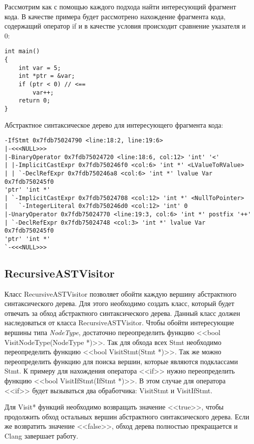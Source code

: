 Рассмотрим как с помощью каждого подхода найти интересующий фрагмент кода. В качестве примера
будет рассмотрено нахождение фрагмента кода, содержащий оператор if и в качестве условия 
происходит сравнение указателя и 0:
\begin{lstlisting}
int main()
{
	int var = 5;
	int *ptr = &var;
	if (ptr < 0) // <==
		var++;
	return 0;
}
\end{lstlisting}

Абстрактное синтаксическое дерево для интересующего фрагмента кода:
\begin{lstlisting}[basicstyle=\tiny]
-IfStmt 0x7fdb75024790 <line:18:2, line:19:6>
|-<<<NULL>>>
|-BinaryOperator 0x7fdb75024720 <line:18:6, col:12> 'int' '<'
| |-ImplicitCastExpr 0x7fdb750246f0 <col:6> 'int *' <LValueToRValue>
| | `-DeclRefExpr 0x7fdb750246a8 <col:6> 'int *' lvalue Var 0x7fdb750245f0 
'ptr' 'int *'
| `-ImplicitCastExpr 0x7fdb75024708 <col:12> 'int *' <NullToPointer>
|   `-IntegerLiteral 0x7fdb750246d0 <col:12> 'int' 0
|-UnaryOperator 0x7fdb75024770 <line:19:3, col:6> 'int *' postfix '++'
| `-DeclRefExpr 0x7fdb75024748 <col:3> 'int *' lvalue Var 0x7fdb750245f0 
'ptr' 'int *'
`-<<<NULL>>>
\end{lstlisting}

\subsection{RecursiveASTVisitor}
Класс RecursiveASTVisitor позволяет обойти каждую вершину абстрактного синтаксического дерева.
Для этого необходимо создать класс, который будет отвечать за обход абстрактного синтаксического 
дерева. Данный класс должен наследоваться от класса RecursiveASTVisitor. Чтобы обойти интересующие вершины
типа {\em NodeType},
достаточно переопределить функцию <<bool VisitNodeType(NodeType *)>>. Так для обхода всех Stmt 
необходимо переопределить функцию <<bool VisitStmt(Stmt *)>>. Так же можно переопределить функцию
для поиска вершин, которые являются подклассами Stmt. К примеру для нахождения оператора <<if>>
нужно переопределить функцию <<bool VisitIfStmt(IfStmt *)>>. В этом случае для оператора <<if>> 
будет вызываться два обработчика: VisitStmt и VisitIfStmt.

Для Visit* функций необходимо возвращать значение <<true>>, чтобы продолжить обход остальных вершин
абстрактного синтаксического дерева. Если же возвратить значение <<false>>, обход дерева полностью
прекращается и Clang завершает работу.

